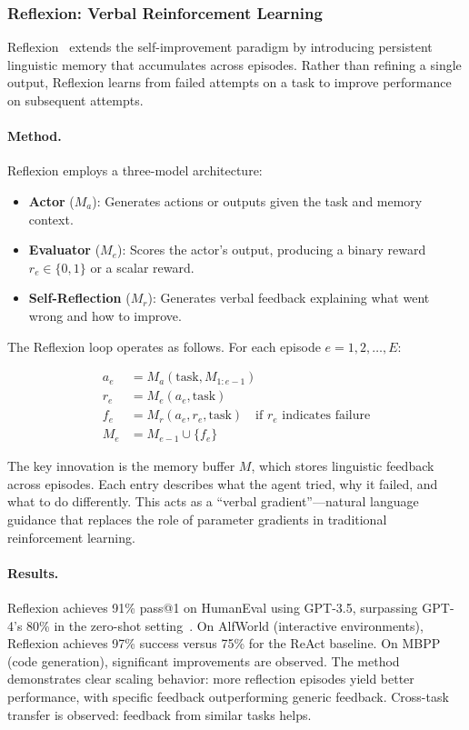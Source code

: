 \subsubsection{Reflexion: Verbal Reinforcement Learning}
\label{sec:reflexion}

Reflexion~\citep{shinn2023reflexion} extends the self-improvement paradigm by introducing persistent linguistic memory that accumulates across episodes. Rather than refining a single output, Reflexion learns from failed attempts on a task to improve performance on subsequent attempts.

\paragraph{Method.}
Reflexion employs a three-model architecture:

\begin{itemize}
    \item \textbf{Actor} ($M_a$): Generates actions or outputs given the task and memory context.
    \item \textbf{Evaluator} ($M_e$): Scores the actor's output, producing a binary reward $r_e \in \{0, 1\}$ or a scalar reward.
    \item \textbf{Self-Reflection} ($M_r$): Generates verbal feedback explaining what went wrong and how to improve.
\end{itemize}

The Reflexion loop operates as follows. For each episode $e = 1, 2, \ldots, E$:

\begin{align}
    a_e &= M_a(\text{task}, M_{1:e-1}) \label{eq:reflexion-actor} \\
    r_e &= M_e(a_e, \text{task}) \label{eq:reflexion-eval} \\
    f_e &= M_r(a_e, r_e, \text{task}) \quad \text{if } r_e \text{ indicates failure} \label{eq:reflexion-reflect} \\
    M_e &= M_{e-1} \cup \{f_e\} \label{eq:reflexion-memory}
\end{align}

The key innovation is the memory buffer $M$, which stores linguistic feedback across episodes. Each entry describes what the agent tried, why it failed, and what to do differently. This acts as a ``verbal gradient''---natural language guidance that replaces the role of parameter gradients in traditional reinforcement learning.

\paragraph{Results.}
Reflexion achieves 91\% pass@1 on HumanEval using GPT-3.5, surpassing GPT-4's 80\% in the zero-shot setting~\citep{shinn2023reflexion}. On AlfWorld (interactive environments), Reflexion achieves 97\% success versus 75\% for the ReAct baseline. On MBPP (code generation), significant improvements are observed. The method demonstrates clear scaling behavior: more reflection episodes yield better performance, with specific feedback outperforming generic feedback. Cross-task transfer is observed: feedback from similar tasks helps.

